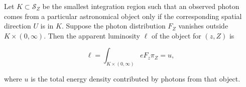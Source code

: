 Let $K \subset \mathcal{S}_Z$ be the smallest integration region such that an observed photon comes from a particular astronomical object only if the corresponding spatial direction $U$ is in $K$. Suppose the photon distribution $F_Z$ vanishes outside $K \times (0, \infty)$. Then the apparent luminosity $\ell$ of the object for $(z, Z)$ is

$$\ell = \int_{K \times (0, \infty)} eF_z \pi_Z = u,$$

where $u$ is the total energy density contributed by photons from that object.
